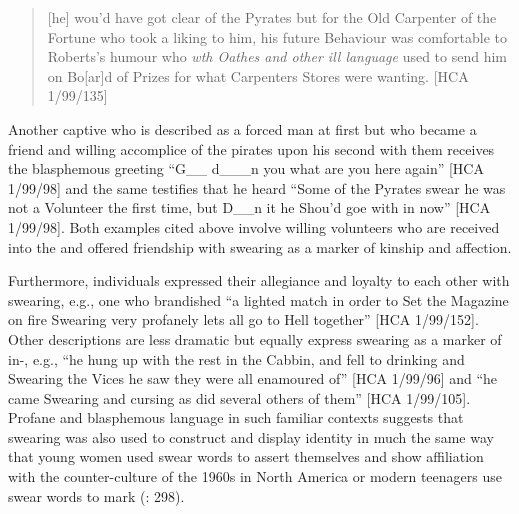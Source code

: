 \begin{quotation}
[he] wou’d have got clear of the Pyrates but for the Old Carpenter of the Fortune who took a liking to him, his future Behaviour was comfortable to Roberts’s humour who \textit{wth Oathes and other ill language} used to send him on Bo[ar]d of Prizes for what Carpenters Stores were wanting. [HCA 1/99/135] \end{quotation}

Another captive who is described as a forced man at first but who became a friend and willing accomplice of the pirates upon his second  with them receives the blasphemous greeting “G\_\_ d\_\_\_n you what are you here again” [HCA 1/99/98] and the same  testifies that he heard “Some of the Pyrates swear he was not a Volunteer the first time, but D\_\_n it he Shou’d goe with in now” [HCA 1/99/98]. Both examples cited above involve willing volunteers who are received into the  and offered friendship with swearing as a marker of kinship and affection. 

Furthermore, individuals expressed their allegiance and loyalty to each other with swearing, e.g., one  who brandished “a lighted match in order to Set the Magazine on fire Swearing very profanely lets all go to Hell together” [HCA 1/99/152]. Other descriptions are less dramatic but equally express swearing as a marker of in-, e.g., “he hung up with the rest in the Cabbin, and fell to drinking and Swearing the Vices he saw they were all enamoured of” [HCA 1/99/96] and “he came Swearing and cursing as did several others of them” [HCA 1/99/105]. Profane and blasphemous language in such familiar contexts suggests that swearing was also used to construct and display identity in much the same way that young women used swear words to assert themselves and show affiliation with the counter-culture of the 1960s in North America \citep[60]{Carlisle2009} or modern teenagers use swear words to mark  (\citealt{Stapleton2010}: 298). 

